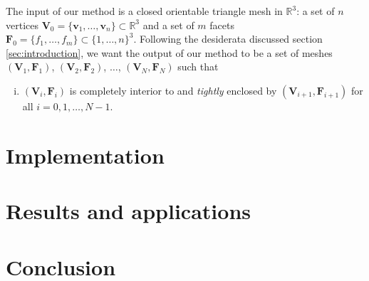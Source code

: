 \documentclass{acmtog}
\begin{document}
The input of our method is a closed orientable triangle mesh in $\mathbb{R}^3$:
a set of $n$ vertices $\mathbf{V}_0= \{ \mathbf{v}_1, \ldots, \mathbf{v}_n \} \subset \mathbb{R}^3$
and a set of $m$ facets $\mathbf{F}_0 = \{ f_1, \ldots, f_m \} \subset \{ 1, \ldots, n \}^3$. 
Following the desiderata discussed section \ref{sec:introduction}, we want the output of our method to be a set of meshes $(\mathbf{V}_1,\mathbf{F}_1)$,  $(\mathbf{V}_2,\mathbf{F}_2)$, $\ldots$, $(\mathbf{V}_N,\mathbf{F}_N)$
such that 

\begin{enumerate}[(i)]
\item $(\mathbf{V}_i,\mathbf{F}_i)$ is completely interior to and \emph{tightly} enclosed by $(\mathbf{V}_{i+1},\mathbf{F}_{i+1})$
for all $i = 0, 1, \ldots, N-1$.
\end{enumerate}

\section{Implementation}
\label{sec:implementation}

\section{Results and applications}
\label{sec:results}

\section{Conclusion}
\label{sec:colnclusion}

\begin{acks}
\end{acks}





\end{document}
